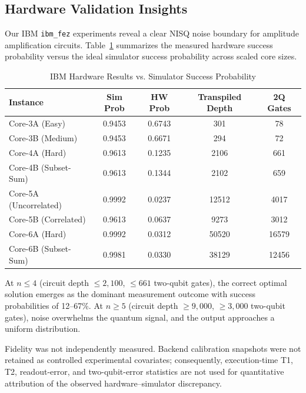 \documentclass[conference]{IEEEtran} \IEEEoverridecommandlockouts
\begin{document}
\subsection{Hardware Validation Insights}

Our IBM \texttt{ibm\_fez} experiments reveal a clear NISQ noise boundary for amplitude amplification circuits. Table~\ref{tab:hardware} summarizes the measured hardware success probability versus the ideal simulator success probability across scaled core sizes.

\begin{table}[htbp]
\caption{IBM Hardware Results vs. Simulator Success Probability}
\label{tab:hardware}
\begin{center}
\footnotesize
\begin{tabular}{lcccc}
\toprule
\textbf{Instance} & \textbf{Sim Prob} & \textbf{HW Prob} & \textbf{Transpiled Depth} & \textbf{2Q Gates} \\
\midrule
Core-3A (Easy) & 0.9453 & 0.6743 & 301 & 78 \\
Core-3B (Medium) & 0.9453 & 0.6671 & 294 & 72 \\
Core-4A (Hard) & 0.9613 & 0.1235 & 2106 & 661 \\
Core-4B (Subset-Sum) & 0.9613 & 0.1344 & 2102 & 659 \\
Core-5A (Uncorrelated) & 0.9992 & 0.0237 & 12512 & 4017 \\
Core-5B (Correlated) & 0.9613 & 0.0637 & 9273 & 3012 \\
Core-6A (Hard) & 0.9992 & 0.0312 & 50520 & 16579 \\
Core-6B (Subset-Sum) & 0.9981 & 0.0330 & 38129 & 12456 \\
\bottomrule
\end{tabular}
\end{center}
\end{table}

At $n \leq 4$ (circuit depth $\leq 2{,}100$, $\leq 661$ two-qubit gates), the correct optimal solution emerges as the dominant measurement outcome with success probabilities of 12--67\%. At $n \geq 5$ (circuit depth $\geq 9{,}000$, $\geq 3{,}000$ two-qubit gates), noise overwhelms the quantum signal, and the output approaches a uniform distribution.

Fidelity was not independently measured. Backend calibration snapshots were not retained as controlled experimental covariates; consequently, execution-time T1, T2, readout-error, and two-qubit-error statistics are not used for quantitative attribution of the observed hardware--simulator discrepancy.
\end{document}
